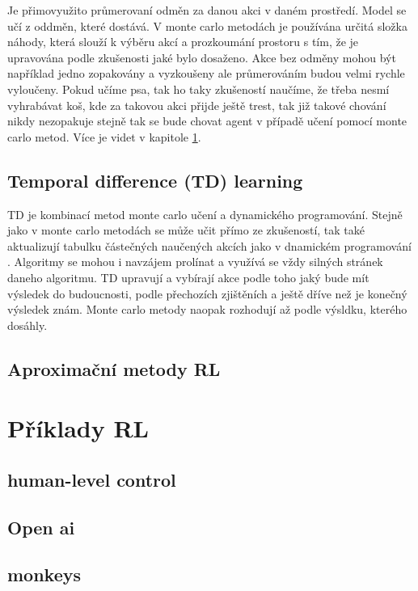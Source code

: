 \documentclass{article}
\begin{document}
Je přimovyužito průmerovaní odměn za danou akci v daném prostředí. Model se učí z oddměn, které dostává. V monte carlo metodách je používána určitá složka náhody, která slouží k výběru akcí a prozkoumání prostoru s tím, že je upravována podle zkušenosti jaké bylo dosaženo. Akce bez odměny mohou být například jedno zopakovány a vyzkoušeny ale průmerováním budou velmi rychle vyloučeny. Pokud učíme psa, tak ho taky zkušeností naučíme, že třeba nesmí vyhrabávat koš, kde za takovou akci přijde ještě trest, tak již takové chování nikdy nezopakuje stejně tak se bude chovat agent v případě učení pomocí monte carlo metod. Více je videt v kapitole \ref{sec:priklady}. 


\subsection{Temporal difference (TD) learning}
TD je kombinací metod monte carlo učení a dynamického programování. Stejně jako v monte carlo metodách se může učit přímo ze zkušeností, tak také aktualizují tabulku částečných naučených akcích jako v dnamickém programování \cite{sutton1998introduction}. Algoritmy se mohou i navzájem prolínat a využívá se vždy silných stránek daneho algoritmu. TD upravují a vybírají akce podle toho jaký bude mít výsledek do budoucnosti, podle přechozích zjištěních a ještě dříve než je konečný výsledek znám. Monte carlo metody naopak rozhodují až podle výsldku, kterého dosáhly.


\subsection{Aproximační metody RL}




\section{Příklady RL}
\label{sec:priklady}

\subsection{human-level control}
\cite{mnih2015human}
\subsection{Open ai}
\cite{openAI}
\cite{baker2019emergent}
\subsection{monkeys}
\label{monkey}
 \cite{monkeyExp}
 \cite{hamel1996competing}
\end{document}
